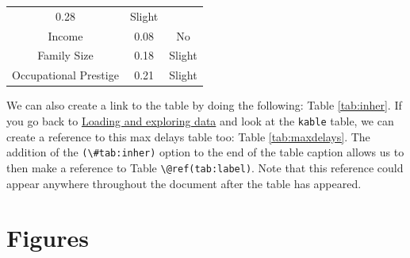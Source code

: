 \documentclass [11pt, proquest] {uwthesis}[2015/03/03]
\begin{document}
\begin{longtable}[]{@{}ccc@{}}
\begin{minipage}[t]{0.47\columnwidth}
0.28\strut
\end{minipage} & \begin{minipage}[t]{0.16\columnwidth}\centering\strut
Slight\strut
\end{minipage}\tabularnewline
\begin{minipage}[t]{0.29\columnwidth}\centering\strut
Income\strut
\end{minipage} & \begin{minipage}[t]{0.47\columnwidth}\centering\strut
0.08\strut
\end{minipage} & \begin{minipage}[t]{0.16\columnwidth}\centering\strut
No\strut
\end{minipage}\tabularnewline
\begin{minipage}[t]{0.29\columnwidth}\centering\strut
Family Size\strut
\end{minipage} & \begin{minipage}[t]{0.47\columnwidth}\centering\strut
0.18\strut
\end{minipage} & \begin{minipage}[t]{0.16\columnwidth}\centering\strut
Slight\strut
\end{minipage}\tabularnewline
\begin{minipage}[t]{0.29\columnwidth}\centering\strut
Occupational Prestige\strut
\end{minipage} & \begin{minipage}[t]{0.47\columnwidth}\centering\strut
0.21\strut
\end{minipage} & \begin{minipage}[t]{0.16\columnwidth}\centering\strut
Slight\strut
\end{minipage}\tabularnewline
\bottomrule
\end{longtable}
We can also create a link to the table by doing the following: Table
\ref{tab:inher}. If you go back to
\protect\hyperlink{loading-and-exploring-data}{Loading and exploring
data} and look at the \texttt{kable} table, we can create a reference to
this max delays table too: Table \ref{tab:maxdelays}. The addition of
the \texttt{(\textbackslash{}\#tab:inher)} option to the end of the
table caption allows us to then make a reference to Table
\texttt{\textbackslash{}@ref(tab:label)}. Note that this reference could
appear anywhere throughout the document after the table has appeared.

\clearpage

\section{Figures}\label{figures}
\end{document}
